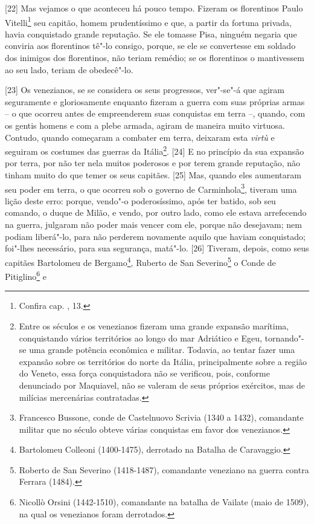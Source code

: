 {[}22{]}
Mas vejamos o que aconteceu há pouco tempo. Fizeram os florentinos Paulo
Vitelli\footnote{Confira cap. , 13.} seu capitão, homem
prudentíssimo e que, a partir da fortuna privada, havia conquistado
grande reputação. Se ele tomasse Pisa, ninguém negaria que conviria aos
florentinos tê"-lo consigo, porque, se ele se convertesse em soldado dos
inimigos dos florentinos, não teriam remédio; se os florentinos o
mantivessem ao seu lado, teriam de obedecê"-lo.

{[}23{]} Os venezianos, se se considera os seus progressos, ver"-se"-á que
agiram seguramente e gloriosamente enquanto fizeram a guerra com suas
próprias armas -- o que ocorreu antes de empreenderem suas conquistas em
terra --, quando, com os gentis homens e com a plebe armada, agiram de
maneira muito virtuosa. Contudo, quando começaram a combater em terra,
deixaram esta \emph{virtù} e seguiram os costumes das guerras da
Itália\footnote{Entre os séculos  e  os venezianos fizeram uma
  grande expansão marítima, conquistando vários territórios ao longo do
  mar Adriático e Egeu, tornando"-se uma grande potência econômica e
  militar. Todavia, ao tentar fazer uma expansão sobre os territórios do
  norte da Itália, principalmente sobre a região do Veneto, essa força
  conquistadora não se verificou, pois, conforme denunciado por
  Maquiavel, não se valeram de seus próprios exércitos, mas de milícias
  mercenárias contratadas.}. {[}24{]} E no princípio da sua expansão por
terra, por não ter nela muitos poderosos e por terem grande reputação,
não tinham muito do que temer os seus capitães. {[}25{]} Mas, quando
eles aumentaram seu poder em terra, o que ocorreu sob o governo de
Carminhola\footnote{Francesco Bussone, conde de Castelnuovo Scrivia
  (1340 a 1432), comandante militar que no século  obteve várias
  conquistas em favor dos venezianos.}, tiveram uma lição deste erro:
porque, vendo"-o poderosíssimo, após ter batido, sob seu comando, o duque
de Milão, e vendo, por outro lado, como ele estava arrefecendo na
guerra, julgaram não poder mais vencer com ele, porque não desejavam;
nem podiam liberá"-lo, para não perderem novamente aquilo que haviam
conquistado; foi"-lhes necessário, para sua segurança, matá"-lo. {[}26{]}
Tiveram, depois, como seus capitães Bartolomeu de Bergamo\footnote{Bartolomeu
  Colleoni (1400-1475), derrotado na Batalha de Caravaggio.}, Ruberto de
San Severino\footnote{Roberto de San Severino (1418-1487), comandante
  veneziano na guerra contra Ferrara (1484).} o Conde de
Pitiglino\footnote{Nicollò Orsini (1442-1510), comandante na batalha de
  Vailate (maio de 1509), na qual os venezianos foram derrotados.} e
